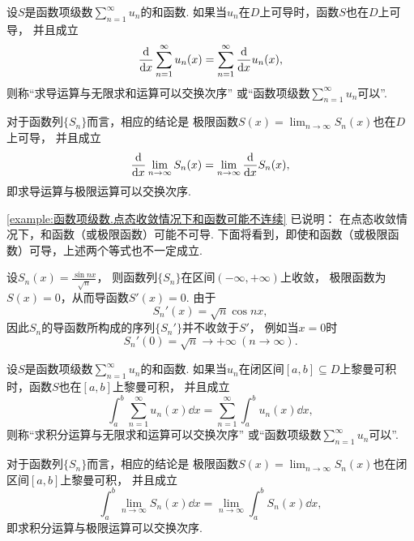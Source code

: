 \begin{definition}
设\(S\)是函数项级数\(\sum_{n=1}^\infty u_n\)的和函数.
如果当\(u_n\)在\(D\)上可导时，函数\(S\)也在\(D\)上可导，
并且成立\[
	\dv{x} \sum_{n=1}^\infty u_n(x)
	= \sum_{n=1}^\infty \dv{x} u_n(x),
\]
则称“求导运算与无限求和运算可以交换次序”
或“函数项级数\(\sum_{n=1}^\infty u_n\)可以”.
\end{definition}
对于函数列\(\{S_n\}\)而言，相应的结论是
极限函数\(S(x) = \lim_{n\to\infty} S_n(x)\)也在\(D\)上可导，
并且成立\[
	\dv{x} \lim_{n\to\infty} S_n(x)
	= \lim_{n\to\infty} \dv{x} S_n(x),
\]
即求导运算与极限运算可以交换次序.

\cref{example:函数项级数.点态收敛情况下和函数可能不连续} 已说明：
在点态收敛情况下，和函数（或极限函数）可能不可导.
下面将看到，即使和函数（或极限函数）可导，上述两个等式也不一定成立.
\begin{example}
设\(S_n(x) = \frac{\sin nx}{\sqrt{n}}\)，
则函数列\(\{S_n\}\)在区间\((-\infty,+\infty)\)上收敛，
极限函数为\(S(x) = 0\)，从而导函数\(S'(x) = 0\).
由于\[
	S_n'(x) = \sqrt{n} \cos nx,
\]
因此\(S_n\)的导函数所构成的序列\(\{S_n'\}\)并不收敛于\(S'\)，
例如当\(x=0\)时\[
	S_n'(0) = \sqrt{n}\to+\infty\ (n\to\infty).
\]
\end{example}

\begin{definition}
设\(S\)是函数项级数\(\sum_{n=1}^\infty u_n\)的和函数.
如果当\(u_n\)在闭区间\([a,b] \subseteq D\)上黎曼可积时，函数\(S\)也在\([a,b]\)上黎曼可积，
并且成立\[
	\int_a^b \sum_{n=1}^\infty u_n(x) \dd{x}
	= \sum_{n=1}^\infty \int_a^b u_n(x) \dd{x},
\]
则称“求积分运算与无限求和运算可以交换次序”
或“函数项级数\(\sum_{n=1}^\infty u_n\)可以”.
\end{definition}
对于函数列\(\{S_n\}\)而言，相应的结论是
极限函数\(S(x) = \lim_{n\to\infty} S_n(x)\)也在闭区间\([a,b]\)上黎曼可积，
并且成立\[
	\int_a^b \lim_{n\to\infty} S_n(x) \dd{x}
	= \lim_{n\to\infty} \int_a^b S_n(x) \dd{x},
\]
即求积分运算与极限运算可以交换次序.


